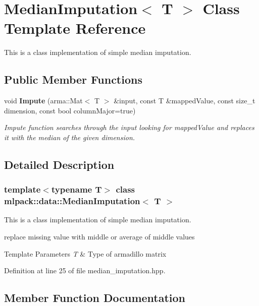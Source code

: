 \section{Median\+Imputation$<$ T $>$ Class Template Reference}
\label{classmlpack_1_1data_1_1MedianImputation}


This is a class implementation of simple median imputation.  


\subsection*{Public Member Functions}
\begin{DoxyCompactItemize}
\item 
void \textbf{ Impute} (arma\+::\+Mat$<$ T $>$ \&input, const T \&mapped\+Value, const size\+\_\+t dimension, const bool column\+Major=true)
\begin{DoxyCompactList}\small\item\em Impute function searches through the input looking for mapped\+Value and replaces it with the median of the given dimension. \end{DoxyCompactList}\end{DoxyCompactItemize}


\subsection{Detailed Description}
\subsubsection*{template$<$typename T$>$\newline
class mlpack\+::data\+::\+Median\+Imputation$<$ T $>$}

This is a class implementation of simple median imputation. 

replace missing value with middle or average of middle values 
\begin{DoxyTemplParams}{Template Parameters}
{\em T} & Type of armadillo matrix \\
\hline
\end{DoxyTemplParams}


Definition at line 25 of file median\+\_\+imputation.\+hpp.



\subsection{Member Function Documentation}
\mbox{\label{classmlpack_1_1data_1_1MedianImputation_a94b8353ed4d68b10e2dd59d5e7dc15ca}} 

